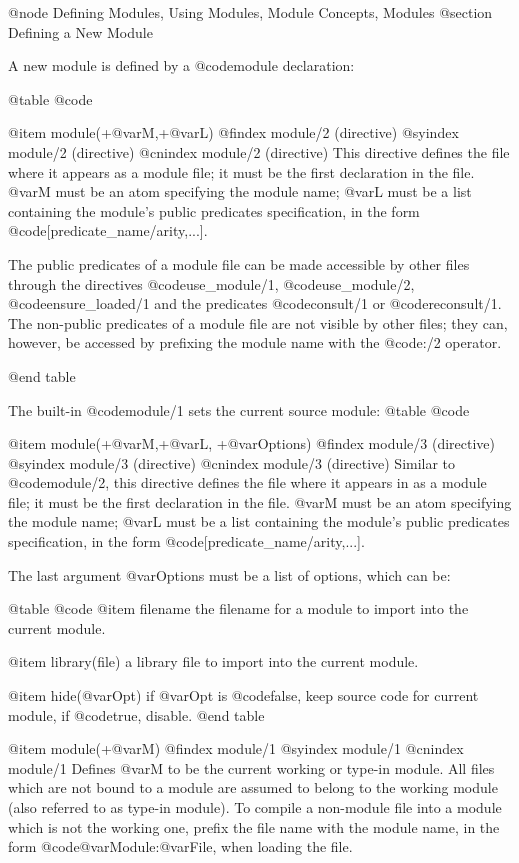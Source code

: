 {{{{@node Defining Modules, Using Modules, Module Concepts, Modules
@section Defining a New Module

A new module is defined by a @code{module} declaration:

@table @code

@item module(+@var{M},+@var{L})
@findex module/2 (directive)
@syindex module/2 (directive)
@cnindex module/2 (directive)
This directive defines the file where it appears as a module file; it
must be the first declaration in the file.
@var{M} must be an atom specifying the module name; @var{L} must be a list
containing the module's public predicates specification, in the form
@code{[predicate_name/arity,...]}.

The public predicates of a module file can be made accessible by other
files through the directives @code{use_module/1}, @code{use_module/2},
@code{ensure_loaded/1} and the predicates @code{consult/1} or
@code{reconsult/1}. The non-public predicates
of a module file are not visible by other files; they can, however, be
accessed by prefixing the module name with the
@code{:/2} operator.

@end table

The built-in @code{module/1} sets the current source module:
@table @code

@item module(+@var{M},+@var{L}, +@var{Options})
@findex module/3 (directive)
@syindex module/3 (directive)
@cnindex module/3 (directive)
Similar to @code{module/2}, this directive defines the file where it
appears in as a module file; it must be the first declaration in the file.
@var{M} must be an atom specifying the module name; @var{L} must be a
list containing the module's public predicates specification, in the
form @code{[predicate_name/arity,...]}.

The last argument @var{Options} must be a list of options, which can be:

@table @code
@item filename
 the filename for a module to import into the current module.

@item library(file)
 a library file to import into the current module.

@item hide(@var{Opt})
 if @var{Opt} is @code{false}, keep source code for current module, if
@code{true}, disable.
@end table

@item module(+@var{M})
@findex module/1
@syindex module/1
@cnindex module/1
Defines @var{M} to be the current working or type-in module. All files
which are not bound to a module are assumed to belong to the working
module (also referred to as type-in module). To compile a non-module
file into a module which is not the working one, prefix the file name
with the module name, in the form @code{@var{Module}:@var{File}}, when
loading the file.

}}}}
